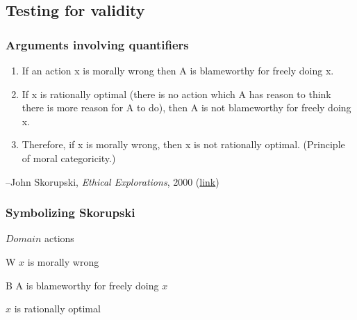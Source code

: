 \subsection{Testing for validity}

\begin{frame}
\frametitle{Arguments involving quantifiers}

\begin{enumerate}[<+->]
\item If an action x is morally wrong then
A is blameworthy for freely doing x.
\item If x is rationally optimal (there is no action which A has
  reason to think there is more reason for A to do), then A is not
  blameworthy for freely doing x.
\item Therefore, if x is morally wrong, then
x is not rationally optimal.
(Principle of moral categoricity.)
\end{enumerate}

\begin{raggedleft}
\small--John Skorupski, \textit{Ethical Explorations}, 2000 (\href{http://books.google.com/books?id=bxIzZYqRZdwC&lpg=PP1&pg=PA170\#v=onepage&q&f=false}{link})
 \end{raggedleft}

\end{frame}

\begin{frame}
  \frametitle{Symbolizing Skorupski}

  \begin{enumerate}
    \end{enumerate}

  \begin{ekey}
  \item[$Domain$] actions
  \item[W\qv{x}] $x$ is morally wrong
  \item[B\qv{x}] A is blameworthy for freely doing $x$
  \item<3->[O\qv{x}] $x$ is rationally optimal
  \end{ekey}
  \begin{earg}
  \item<1->[] 
  \item<3->[] 
  \item<5->[\therefore] 
  \end{earg}

  \end{frame}

